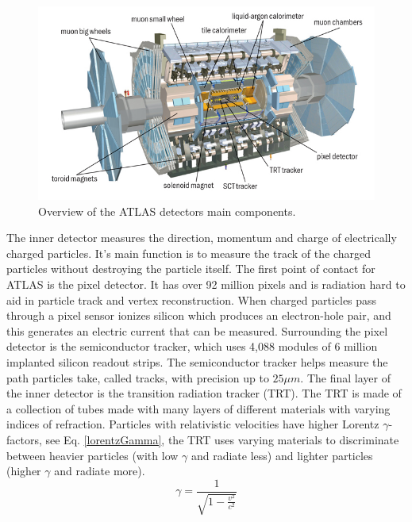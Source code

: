 \begin{figure}[h]
    \centering
    \includegraphics[width=.8\textwidth]{content/img/ATLAS_Detector.jpg}
    \caption{Overview of the ATLAS detectors main components. \cite{ATLAS_Illustration}}
    \label{fig:intro_ATLAS_detector}
\end{figure}


The inner detector measures the direction, momentum and charge of electrically charged particles.
It's main function is to measure the track of the charged particles without destroying the particle itself.
The first point of contact for ATLAS is the pixel detector. 
It has over 92 million pixels and is radiation hard to aid in particle track and vertex reconstruction.\cite{Hugging2006}
When charged particles pass through a pixel sensor ionizes silicon which produces an electron-hole pair, and this generates an electric current that can be measured. \cite{Giangiacomi:2684079}
Surrounding the pixel detector is the semiconductor tracker, which uses 4,088 modules of 6 million implanted silicon readout strips.
The semiconductor tracker helps measure the path particles take, called tracks, with precision up to $25\mu m$. 
The final layer of the inner detector is the transition radiation tracker (TRT). 
The TRT is made of a collection of tubes made with many layers of different materials with varying indices of refraction.  
Particles with relativistic velocities have higher Lorentz $\gamma$-factors, see Eq. \eqref{lorentzGamma}, the TRT uses varying materials to discriminate between heavier particles (with low $\gamma$ and radiate less) and lighter particles (higher $\gamma$ and radiate more). \cite{Mindur:2139567}
\begin{equation}\label{lorentzGamma}
    \gamma = \frac{1}{\sqrt{1 - \frac{v^2}{c^2}}}
\end{equation}

